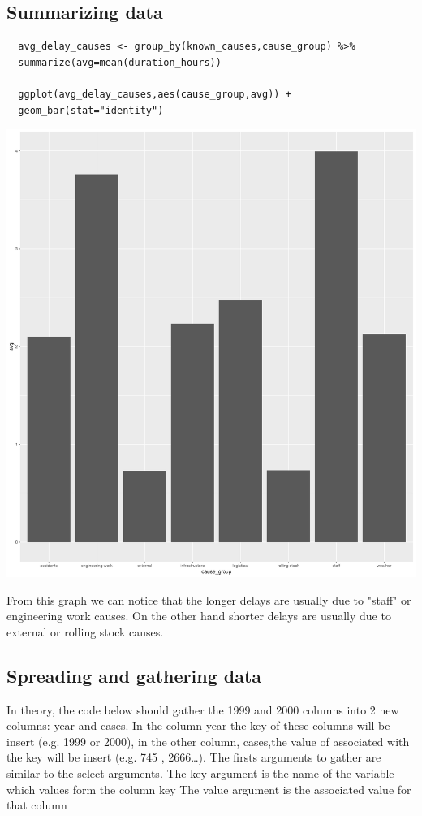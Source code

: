 \documentclass[11pt]{article}
\begin{document}
\subsection{Summarizing data}
\label{sec:org2028fe2}
\begin{verbatim}
  avg_delay_causes <- group_by(known_causes,cause_group) %>%
  summarize(avg=mean(duration_hours))

  ggplot(avg_delay_causes,aes(cause_group,avg)) +
  geom_bar(stat="identity")
\end{verbatim}

\begin{center}
  \includegraphics[width=.9\linewidth]{avg_delay_causes.jpg}
\end{center}

From this graph we can notice that the longer delays are usually
due to "staff" or engineering work causes. On the other hand
shorter delays are usually due to external or rolling stock causes.

\subsection{Spreading and gathering data}
\label{sec:orgae6ca5a}

In theory, the code below should gather the 1999 and 2000 columns into 2 new columns:
year and cases. In the column year the key of these columns will be insert (e.g. 1999 or 2000),
in the other column, cases,the value of associated with the key will be insert (e.g. 745 , 2666\ldots{}).
The firsts arguments to gather are similar to the select arguments.
The key argument is the name of the variable which values form the column key
The value argument is the associated value for that column
\end{document}
